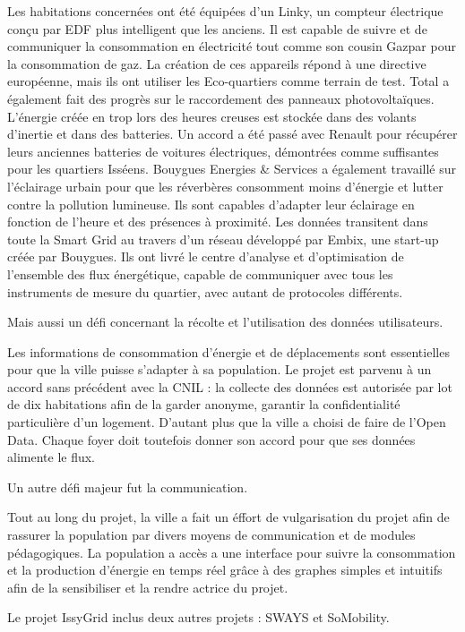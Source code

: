 Les habitations concernées ont été équipées d'un Linky, un compteur électrique conçu par EDF
plus intelligent que les anciens. Il est capable de suivre et de communiquer la consommation en 
électricité tout comme son cousin Gazpar pour la consommation de gaz. La création de ces appareils répond
à une directive européenne, mais ils ont utiliser les Eco-quartiers comme terrain de test.
Total a également fait des progrès sur le raccordement des panneaux photovoltaïques.  
L'énergie créée en trop lors des heures creuses est stockée dans des volants d'inertie et dans des 
batteries. Un accord a été passé avec Renault pour récupérer leurs anciennes batteries de voitures
électriques, démontrées comme suffisantes pour les quartiers Isséens. 
Bouygues Energies \& Services a également travaillé sur l'éclairage urbain pour que les réverbères 
consomment moins d'énergie et lutter contre la pollution lumineuse. Ils sont capables d'adapter
leur éclairage en fonction de l'heure et des présences à proximité.   
Les données transitent dans toute la Smart Grid au travers d'un réseau développé par Embix, une
start-up créée par Bouygues. Ils ont livré le centre d'analyse et d'optimisation de l'ensemble des
flux énergétique, capable de communiquer avec tous les instruments de mesure du quartier, avec autant de
protocoles différents.

Mais aussi un défi concernant la récolte et l'utilisation des données utilisateurs.

Les informations de consommation d'énergie et de déplacements sont essentielles pour que la ville
puisse s'adapter à sa population. Le projet est parvenu à un accord sans précédent avec la CNIL : 
la collecte des données est autorisée par lot de dix habitations afin de la garder anonyme, garantir
la confidentialité particulière d'un logement. 
D'autant plus que la ville a choisi de faire de l'Open Data. Chaque foyer doit toutefois
donner son accord pour que ses données alimente le flux.

Un autre défi majeur fut la communication. 

Tout au long du projet, la ville a fait un éffort de vulgarisation du projet afin de rassurer 
la population par divers moyens de communication et de modules pédagogiques. La population a accès 
a une interface pour suivre la consommation et la production d'énergie en temps réel grâce à des 
graphes simples et intuitifs afin de la sensibiliser et la rendre actrice du projet.
 
Le projet IssyGrid inclus deux autres projets : SWAYS et SoMobility.

